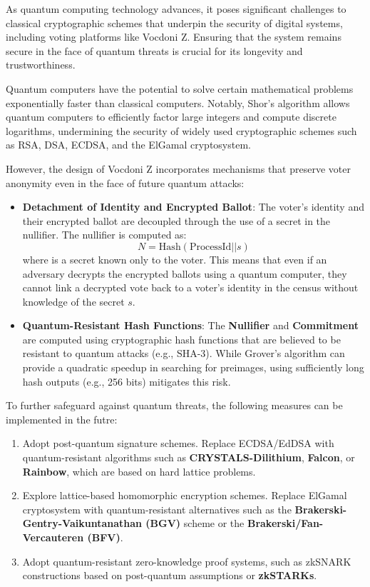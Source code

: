 
As quantum computing technology advances, it poses significant challenges to classical cryptographic schemes that underpin the security of digital systems, including voting platforms like Vocdoni Z. Ensuring that the system remains secure in the face of quantum threats is crucial for its longevity and trustworthiness.

Quantum computers have the potential to solve certain mathematical problems exponentially faster than classical computers. Notably, Shor's algorithm allows quantum computers to efficiently factor large integers and compute discrete logarithms, undermining the security of widely used cryptographic schemes such as RSA, DSA, ECDSA, and the ElGamal cryptosystem.

However, the design of Vocdoni Z incorporates mechanisms that preserve voter anonymity even in the face of future quantum attacks:

\begin{itemize}
	\item \textbf{Detachment of Identity and Encrypted Ballot}: The voter's identity and their encrypted ballot are decoupled through the use of a secret in the nullifier. The nullifier is computed as:
		$$ N = \text{Hash}(\text{ProcessId} || s) $$	
	where is a secret known only to the voter. This means that even if an adversary decrypts the encrypted ballots using a quantum computer, they cannot link a decrypted vote back to a voter's identity in the census without knowledge of the secret $s$.
	\item \textbf{Quantum-Resistant Hash Functions}: The \textbf{Nullifier} and \textbf{Commitment} are computed using cryptographic hash functions that are believed to be resistant to quantum attacks (e.g., SHA-3). While Grover's algorithm can provide a quadratic speedup in searching for preimages, using sufficiently long hash outputs (e.g., 256 bits) mitigates this risk.
\end{itemize}

To further safeguard against quantum threats, the following measures can be implemented in the futre:

\begin{enumerate}
	\item Adopt post-quantum signature schemes. Replace ECDSA/EdDSA with quantum-resistant algorithms such as \textbf{CRYSTALS-Dilithium}, \textbf{Falcon}, or \textbf{Rainbow}, which are based on hard lattice problems.
	
	\item Explore lattice-based homomorphic encryption schemes. Replace ElGamal cryptosystem with quantum-resistant alternatives such as the \textbf{Brakerski-Gentry-Vaikuntanathan (BGV)} scheme or the \textbf{Brakerski/Fan-Vercauteren (BFV)}.
	
	\item Adopt quantum-resistant zero-knowledge proof systems, such as zkSNARK constructions based on post-quantum assumptions or \textbf{zkSTARKs}.
\end{enumerate}